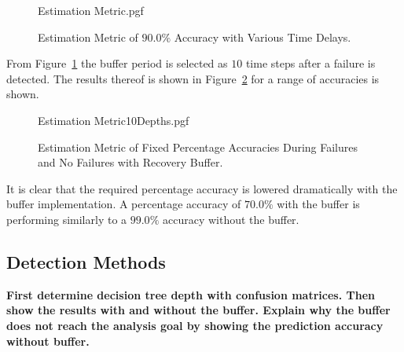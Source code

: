 \documentclass[letterpaper, 10 pt, conference]{ieeeconf}  %
\begin{document}
\begin{figure}[!htb]
	\begin{center}
		{Estimation Metric.pgf}
	\end{center}
	\caption[Estimation Metric of $90.0\%$ Accuracy with Various Time Delays]{Estimation Metric of $90.0\%$ Accuracy with Various Time Delays.}
	\label{fig:Prediction Accuracy 90.0 with various steps summary}
\end{figure}

From Figure~\ref{fig:Prediction Accuracy 90.0 with various steps summary} the buffer period is selected as $10$ time steps after a failure is detected. The results thereof is shown in Figure~\ref{fig:Estimation Accuracy EKF-ignore with Recovery Buffer} for a range of accuracies is shown. 

\begin{figure}[!htb]
	\begin{center}
		{Estimation Metric10Depths.pgf}
	\end{center}
	\caption[Estimation Metric of Fixed Percentage Accuracies During Failures and No Failures with Recovery Buffer]{Estimation Metric of Fixed Percentage Accuracies During Failures and No Failures with Recovery Buffer.}
	\label{fig:Estimation Accuracy EKF-ignore with Recovery Buffer}
\end{figure}

It is clear that the required percentage accuracy is lowered dramatically with the buffer implementation. A percentage accuracy of $70.0\%$ with the buffer is performing similarly to a $99.0\%$ accuracy without the buffer. 

\subsection{Detection Methods}
\textbf{First determine decision tree depth with confusion matrices. Then show the results with and without the buffer. Explain why the buffer does not reach the analysis goal by showing the prediction accuracy without buffer.}
\end{document}
